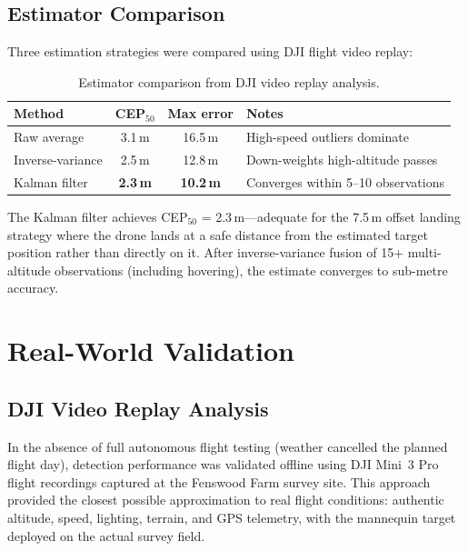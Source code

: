 \documentclass[10pt,a4paper]{article}
\begin{document}
\subsection{Estimator Comparison}

Three estimation strategies were compared using DJI flight video replay:

\begin{table}[ht]
  \centering
  \caption{Estimator comparison from DJI video replay analysis.}\label{tab:estimator-comparison}
  \begin{tabular}{@{}l c c l@{}}
    \toprule
    \textbf{Method} & \textbf{CEP$_{50}$} & \textbf{Max error} & \textbf{Notes} \\
    \midrule
    Raw average & 3.1\,m & 16.5\,m & High-speed outliers dominate \\
    Inverse-variance & 2.5\,m & 12.8\,m & Down-weights high-altitude passes \\
    Kalman filter & \textbf{2.3\,m} & \textbf{10.2\,m} & Converges within 5--10 observations \\
    \bottomrule
  \end{tabular}
\end{table}

The Kalman filter achieves CEP$_{50}$ = 2.3\,m---adequate for the 7.5\,m offset landing strategy where the drone lands at a safe distance from the estimated target position rather than directly on it.  After inverse-variance fusion of 15+ multi-altitude observations (including hovering), the estimate converges to sub-metre accuracy.


\section{Real-World Validation}\label{sec:validation}

\subsection{DJI Video Replay Analysis}\label{sec:val:dji}

In the absence of full autonomous flight testing (weather cancelled the planned flight day), detection performance was validated offline using DJI Mini~3 Pro flight recordings captured at the Fenswood Farm survey site. This approach provided the closest possible approximation to real flight conditions: authentic altitude, speed, lighting, terrain, and GPS telemetry, with the mannequin target deployed on the actual survey field.
\end{document}
